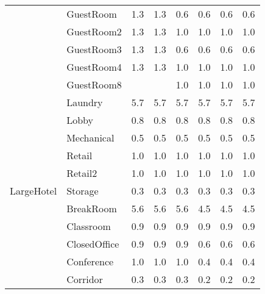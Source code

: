 \begin{center}
\begin{longtable}{p{1.25in}p{1in}p{0.5in}p{0.5in}p{0.5in}p{0.5in}p{0.5in}p{0.5in}}
                                   & GuestRoom                            & 1.3     & 1.3     & 0.6    & 0.6   & 0.6   & 0.6    \\
                                   & GuestRoom2                           & 1.3     & 1.3     & 1.0    & 1.0   & 1.0   & 1.0    \\
                                   & GuestRoom3                           & 1.3     & 1.3     & 0.6    & 0.6   & 0.6   & 0.6    \\
                                   & GuestRoom4                           & 1.3     & 1.3     & 1.0    & 1.0   & 1.0   & 1.0    \\
                                   & GuestRoom8                           &         &         & 1.0    & 1.0   & 1.0   & 1.0    \\
                                   & Laundry                              & 5.7     & 5.7     & 5.7    & 5.7   & 5.7   & 5.7    \\
                                   & Lobby                                & 0.8     & 0.8     & 0.8    & 0.8   & 0.8   & 0.8    \\
                                   & Mechanical                           & 0.5     & 0.5     & 0.5    & 0.5   & 0.5   & 0.5    \\
                                   & Retail                               & 1.0     & 1.0     & 1.0    & 1.0   & 1.0   & 1.0    \\
                                   & Retail2                              & 1.0     & 1.0     & 1.0    & 1.0   & 1.0   & 1.0    \\
LargeHotel                         & Storage                              & 0.3     & 0.3     & 0.3    & 0.3   & 0.3   & 0.3    \\
                                   & BreakRoom                            & 5.6     & 5.6     & 5.6    & 4.5   & 4.5   & 4.5    \\
                                   & Classroom                            & 0.9     & 0.9     & 0.9    & 0.9   & 0.9   & 0.9    \\
                                   & ClosedOffice                         & 0.9     & 0.9     & 0.9    & 0.6   & 0.6   & 0.6    \\
                                   & Conference                           & 1.0     & 1.0     & 1.0    & 0.4   & 0.4   & 0.4    \\
                                   & Corridor                             & 0.3     & 0.3     & 0.3    & 0.2   & 0.2   & 0.2    \\

\end{longtable}
\end{center}
